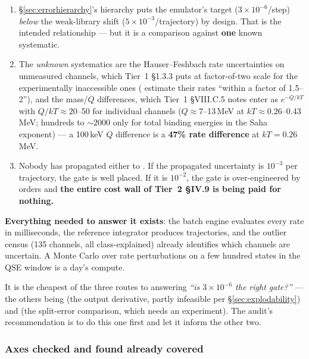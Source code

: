 \begin{enumerate}
\item \S\ref{sec:errorhierarchy}'s hierarchy puts the emulator's target
  ($3\times10^{-6}$/step) \emph{below} the weak-library shift
  ($5\times10^{-3}$/trajectory) by design. That is the intended relationship ---
  but it is a comparison against \textbf{one} known systematic.
\item The \emph{unknown} systematics are the Hauser--Feshbach rate uncertainties
  on unmeasured channels, which Tier~1 \S 1.3.3 puts at factor-of-two scale for
  the experimentally inaccessible ones (\citealt{rauscher2000} estimate their
  rates ``within a factor of 1.5--2''), and the mass/$Q$ differences, which
  Tier~1 \S VIII.C.5 notes enter as $e^{-Q/kT}$ with $Q/kT \approx 20$--50 for
  individual channels ($Q \approx 7$--13\,MeV at $kT \approx 0.26$--0.43\,MeV;
  hundreds to ${\sim}2000$ only for total binding energies in the Saha exponent)
  --- a 100\,keV $Q$ difference is a \textbf{47\% rate difference} at
  $kT = 0.26$\,MeV.
\item Nobody has propagated either to \Ye. If the propagated uncertainty is
  $10^{-3}$ per trajectory, the gate is well placed. If it is $10^{-2}$, the
  gate is over-engineered by orders and \textbf{the entire cost wall of Tier~2
  \S IV.9 is being paid for nothing.}
\end{enumerate}

\textbf{Everything needed to answer it exists}: the batch engine evaluates every
rate in milliseconds, the reference integrator produces trajectories, and the
outlier census (135 channels, all class-explained) already identifies which
channels are uncertain. A Monte Carlo over rate perturbations on a few hundred
states in the QSE window is a day's compute.

It is the cheapest of the three routes to answering \emph{``is $3\times10^{-6}$
the right gate?''} --- the others being  (the output derivative,
partly infeasible per \S\ref{sec:explodability}) and  (the
split-error comparison, which needs an experiment). The audit's recommendation
is to do this one first and let it inform the other two.

\subsubsection{Axes checked and found already covered}
\label{sec:axescovered}

